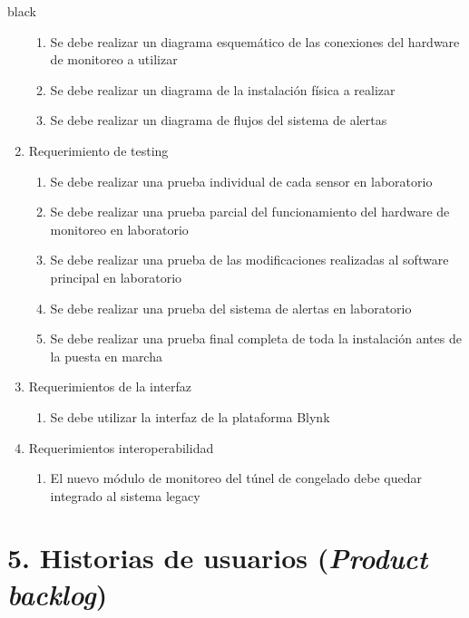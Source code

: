 \documentclass[
11pt, %
]{charter}
\begin{document}
\begin{consigna}{black}
\begin{enumerate}
\begin{enumerate}
			\item Se debe realizar un diagrama esquemático de las conexiones del hardware de monitoreo a utilizar
			\item Se debe realizar un diagrama de la instalación física a realizar
			\item Se debe realizar un diagrama de flujos del sistema de alertas
		\end{enumerate}
	\item Requerimiento de testing
		\begin{enumerate}		
			\item Se debe realizar una prueba individual de cada sensor en laboratorio
			\item Se debe realizar una prueba parcial del funcionamiento del hardware de monitoreo en laboratorio
			\item Se debe realizar una prueba de las modificaciones realizadas al software principal en laboratorio
			\item Se debe realizar una prueba del sistema de alertas en laboratorio
			\item Se debe realizar una prueba final completa de toda la instalación antes de la puesta en marcha
		\end{enumerate}
	\item Requerimientos de la interfaz
		\begin{enumerate}		
			\item Se debe utilizar la interfaz de la plataforma Blynk
		\end{enumerate}
	\item Requerimientos interoperabilidad
		\begin{enumerate}		
			\item El nuevo módulo de monitoreo del túnel de congelado debe quedar integrado al sistema legacy
		\end{enumerate}
\end{enumerate}
\end{consigna}

\section{5. Historias de usuarios (\textit{Product backlog})}
\label{sec:backlog}
\end{document}
